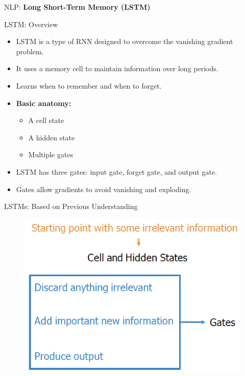 \begin{frame}{}
    \LARGE NLP: \textbf{Long Short-Term Memory (LSTM)}
\end{frame}

\begin{frame}[allowframebreaks]{LSTM: Overview}
    \begin{itemize}
        \item LSTM is a type of RNN designed to overcome the vanishing gradient problem.
        \item It uses a memory cell to maintain information over long periods.
        \item Learns when to remember and when to forget.
        \item \textbf{Basic anatomy:}
        \begin{itemize}
            \item A cell state
            \item A hidden state
            \item Multiple gates
        \end{itemize}
        \item LSTM has three gates: input gate, forget gate, and output gate.
        \item Gates allow gradients to avoid vanishing and exploding.
    \end{itemize}
\end{frame}

\begin{frame}{LSTMs: Based on Previous Understanding}
    \begin{figure}
        \centering
        \includegraphics[width=\linewidth, height=0.9\textheight,keepaspectratio]{images/nlp/lstm-previous.png}
    \end{figure}
\end{frame}

